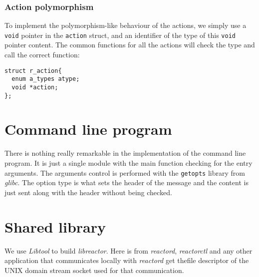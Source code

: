 \subsubsection{Action polymorphism}
To implement the polymorphism-like behaviour of the actions, we simply use a \texttt{void} pointer in the \texttt{action} struct, and an 
identifier of the type of this \texttt{void} pointer content. The common functions for all the actions will check the type and call the
correct function:
\begin{verbatim}
struct r_action{
  enum a_types atype;
  void *action;
};
\end{verbatim}
\section{Command line program}
There is nothing really remarkable in the implementation of the command line program. It is just a single
module with the main function checking for the entry arguments. The arguments control is performed with the \texttt{getopts} library from
\emph{glibc}. The option type is what sets the header of the message and the content is just sent along with the header without being 
checked.
\section{Shared library}
We use \emph{Libtool} to build \emph{libreactor}. Here is from \emph{reactord}, \emph{reactorctl} and any other application that 
communicates locally with \emph{reactord} get thefile descriptor of the UNIX domain stream socket used for that communication.
